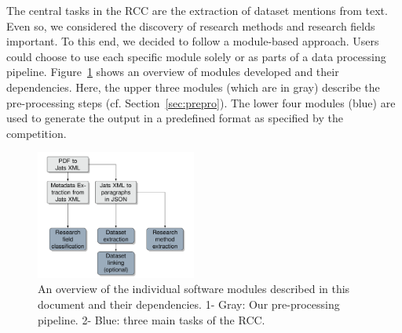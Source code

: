 




The central tasks in the RCC are the extraction of dataset mentions from text. 
Even so, we considered the discovery of research methods and research fields important.
To this end, we decided to follow a module-based approach. Users could choose to use each specific module solely or as parts of a data processing pipeline.
Figure~\ref{figure:pipeline} shows an overview of modules developed and their dependencies.
Here, the upper three modules (which are in gray) describe the pre-processing steps (cf. Section~\ref{sec:prepro}).
The lower four modules (blue) are used to generate the output in a predefined format as specified by the competition.

\begin{figure}[t]
    \includegraphics[width=0.47\textwidth]{figures/information-flow.png}
    \caption{An overview of the individual software modules described in this document and their dependencies. 1- Gray: Our pre-processing pipeline. 2- Blue: three main tasks of the RCC.}
    \label{figure:pipeline}
\end{figure}


